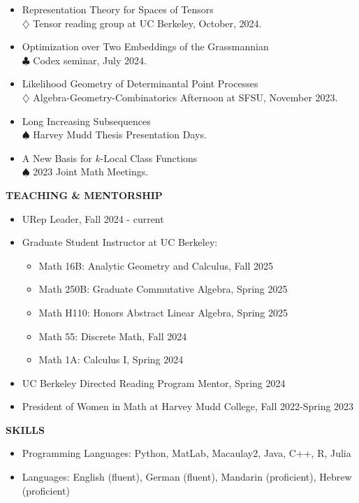 \documentclass[11pt]{article}
\newcommand{\hdr}[1]{\textcolor{blue(ryb)}{\textbf{#1}}}
\begin{document}
\begin{itemize}
\item Representation Theory for Spaces of Tensors\\
  $\diamondsuit$ Tensor reading group at UC Berkeley, October, 2024. 
\item Optimization over Two Embeddings of the Grassmannian\\
  $\clubsuit$ Codex seminar, July 2024. 
\item Likelihood Geometry of Determinantal Point Processes\\
  $\diamondsuit$ Algebra-Geometry-Combinatorics Afternoon at SFSU, November 2023.
\item Long Increasing Subsequences\\
  $\spadesuit$ Harvey Mudd Thesis Presentation Days.
\item A New Basis for $k$-Local Class Functions\\
  $\spadesuit$ 2023 Joint Math Meetings.
\end{itemize}

\bigskip


\hdr{TEACHING \& MENTORSHIP}\\
\begin{itemize}
\item URep Leader, Fall 2024 - current
\item Graduate Student Instructor at UC Berkeley:
  \begin{itemize}
  \item Math 16B: Analytic Geometry and Calculus, Fall 2025
  \item Math 250B: Graduate Commutative Algebra, Spring 2025
  \item Math H110: Honors Abstract Linear Algebra, Spring 2025
  \item Math 55: Discrete Math, Fall 2024
  \item Math 1A: Calculus I, Spring 2024
  \end{itemize}
\item UC Berkeley Directed Reading Program Mentor, Spring 2024
\item President of Women in Math at Harvey Mudd College, Fall 2022-Spring 2023
\end{itemize}

\bigskip

\hdr{SKILLS}\\
\begin{itemize}
\item 
Programming Languages: Python, MatLab, Macaulay2, Java, C++, R, Julia\\
\item 
Languages: English (fluent), German (fluent), Mandarin (proficient), Hebrew (proficient)
\end{itemize}
\end{document}
